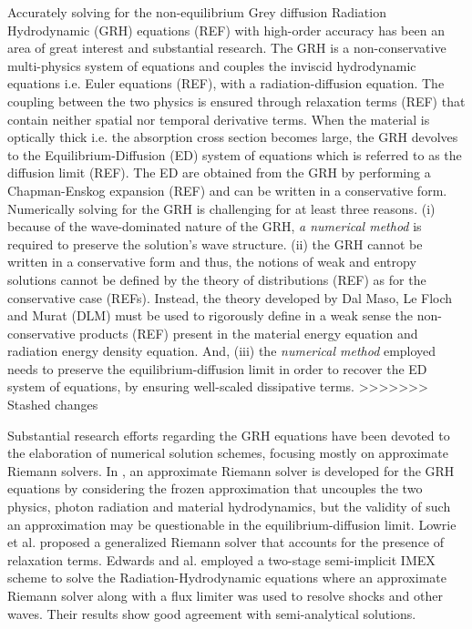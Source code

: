 \documentclass[times,doublespace]{fldauth}%
\begin{document}
Accurately solving for the non-equilibrium Grey diffusion Radiation Hydrodynamic (GRH) equations (REF) with high-order accuracy has been an area of great interest and substantial research. The GRH is a non-conservative multi-physics system of equations and couples the inviscid hydrodynamic equations i.e. Euler equations (REF), with a radiation-diffusion equation. The coupling between the two physics is ensured through relaxation terms (REF) that contain neither spatial nor temporal derivative terms. When the material is optically thick i.e. the absorption cross section becomes large, the GRH devolves to the Equilibrium-Diffusion (ED) system of equations which is referred to as the diffusion limit (REF). The ED are obtained from the GRH by performing a Chapman-Enskog expansion (REF) and can be written in a conservative form. Numerically solving for the GRH is challenging for at least three reasons. (i) because of the wave-dominated nature of the GRH, \emph{a numerical method} is required to preserve the solution's wave structure. (ii) the GRH cannot be written in a conservative form and thus, the notions of weak and entropy solutions cannot be defined by the theory of distributions (REF) as for the conservative case (REFs). Instead, the theory developed by Dal Maso, Le Floch and Murat (DLM) must be used to rigorously define in a weak sense the non-conservative products (REF) present in the material energy equation and radiation energy density equation. And, (iii) the \emph{numerical method} employed needs to preserve the equilibrium-diffusion limit in order to recover the ED system of equations, by ensuring well-scaled dissipative terms.
>>>>>>> Stashed changes

Substantial research efforts regarding the GRH equations have been devoted to the elaboration of 
numerical solution schemes, focusing mostly on approximate Riemann solvers. In \cite{Balsara}, an 
approximate Riemann solver is developed for the GRH equations by considering the frozen approximation that 
uncouples the two physics, photon radiation and material hydrodynamics, but the validity of such an 
approximation may be questionable in the equilibrium-diffusion limit. Lowrie et al. \cite{LowrieMorelHittinger} 
proposed a generalized Riemann solver that accounts for the presence of relaxation terms. Edwards and al. 
\cite{EdwardsMorelLowrie} employed a two-stage semi-implicit IMEX scheme to solve the Radiation-Hydrodynamic 
equations where an approximate Riemann solver along with a flux limiter was used to resolve shocks and other waves. 
Their results show good agreement with semi-analytical solutions. 
\end{document}
